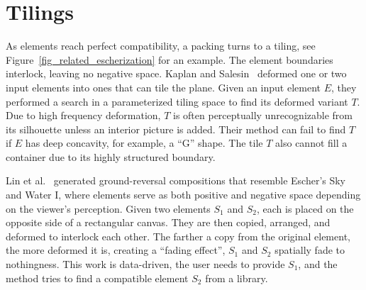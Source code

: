 \section{Tilings}

\newtext
{
As elements reach perfect compatibility, a packing turns to a tiling, see Figure~\ref{fig_related_escherization} for an example.
The element boundaries interlock, leaving no negative space.
Kaplan and Salesin~\cite{Kaplan2000, Kaplan2004} deformed one or two 
input elements into ones that can tile the plane.
Given an input element $E$, they performed a search in a parameterized tiling space to find its
deformed variant $T$.
Due to high frequency deformation,
$T$ is often perceptually unrecognizable from its silhouette unless an interior picture is added.
Their method can fail to find $T$ if $E$ has deep concavity, for example, a ``G'' shape.
The tile $T$ also cannot fill a container due to its highly structured boundary.
}

\newtext
{
Lin et al.~\cite{Lin2018} generated ground-reversal compositions that resemble Escher's Sky and Water I,
where elements serve as both positive and negative space depending on the viewer's perception.
Given two elements $S_1$ and $S_2$, each is placed on the opposite side of a rectangular canvas.
They are then copied, arranged, and deformed to interlock each other.
The farther a copy from the original element, the more deformed it is, 
creating a ``fading effect'', $S_1$ and $S_2$ spatially fade to nothingness.
This work is data-driven, the user needs to provide $S_1$, 
and the method tries to find a compatible element $S_2$ from a library.
}



